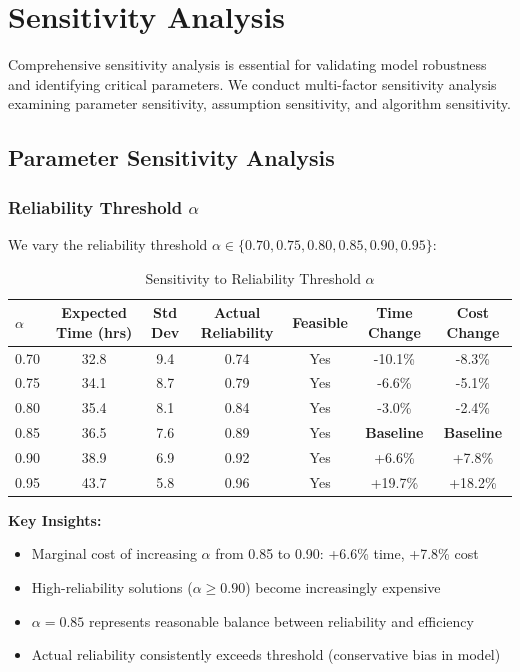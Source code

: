 \section{Sensitivity Analysis}
\label{sec:sensitivity}

Comprehensive sensitivity analysis is essential for validating model robustness and identifying critical parameters. We conduct multi-factor sensitivity analysis examining parameter sensitivity, assumption sensitivity, and algorithm sensitivity.

\subsection{Parameter Sensitivity Analysis}

\subsubsection{Reliability Threshold $\alpha$}

We vary the reliability threshold $\alpha \in \{0.70, 0.75, 0.80, 0.85, 0.90, 0.95\}$:

\begin{table}[H]
\centering
\caption{Sensitivity to Reliability Threshold $\alpha$}
\begin{tabular}{lcccccc}
\toprule
$\alpha$ & Expected Time (hrs) & Std Dev & Actual Reliability & Feasible & Time Change & Cost Change \\
\midrule
0.70 & 32.8 & 9.4 & 0.74 & Yes & -10.1\% & -8.3\% \\
0.75 & 34.1 & 8.7 & 0.79 & Yes & -6.6\% & -5.1\% \\
0.80 & 35.4 & 8.1 & 0.84 & Yes & -3.0\% & -2.4\% \\
0.85 & 36.5 & 7.6 & 0.89 & Yes & \textbf{Baseline} & \textbf{Baseline} \\
0.90 & 38.9 & 6.9 & 0.92 & Yes & +6.6\% & +7.8\% \\
0.95 & 43.7 & 5.8 & 0.96 & Yes & +19.7\% & +18.2\% \\
\bottomrule
\end{tabular}
\end{table}

\textbf{Key Insights:}
\begin{itemize}
\item Marginal cost of increasing $\alpha$ from 0.85 to 0.90: +6.6\% time, +7.8\% cost
\item High-reliability solutions ($\alpha \geq 0.90$) become increasingly expensive
\item $\alpha = 0.85$ represents reasonable balance between reliability and efficiency
\item Actual reliability consistently exceeds threshold (conservative bias in model)
\end{itemize}

